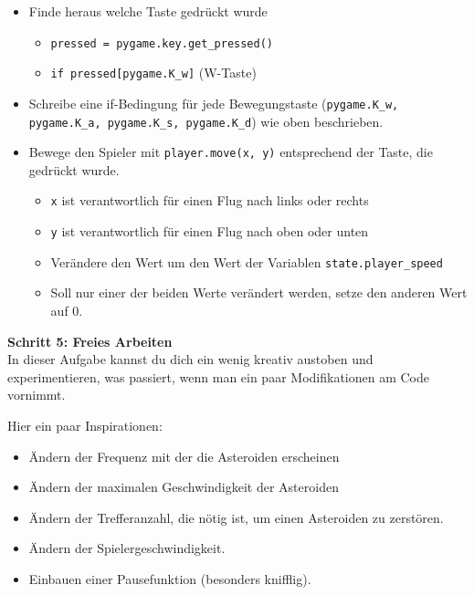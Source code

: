 \begin{itemize}
	\item Finde heraus welche Taste gedrückt wurde
	\begin{itemize}
		\item \texttt{pressed = pygame.key.get\_pressed()}
		\item \texttt{if pressed[pygame.K\_w]} (W-Taste)
	\end{itemize}
	\item Schreibe eine if-Bedingung für jede Bewegungstaste (\texttt{pygame.K\_w, pygame.K\_a, pygame.K\_s, pygame.K\_d}) wie oben beschrieben.
	\item Bewege den Spieler mit \texttt{player.move(x, y)} entsprechend der Taste, die gedrückt wurde.
	\begin{itemize}
		\item \texttt{x} ist verantwortlich für einen Flug nach links oder rechts
		\item \texttt{y} ist verantwortlich für einen Flug nach oben oder unten
		\item Verändere den Wert um den Wert der Variablen \texttt{state.player\_speed}
		\item Soll nur einer der beiden Werte verändert werden, setze den anderen Wert auf 0.
	\end{itemize}	 
\end{itemize}
\textbf{Schritt 5: Freies Arbeiten}\\
In dieser Aufgabe kannst du dich ein wenig kreativ austoben und experimentieren, was passiert, wenn man ein paar Modifikationen am Code vornimmt.

Hier ein paar Inspirationen:
\begin{itemize}
	\item Ändern der Frequenz mit der die Asteroiden erscheinen
	\item Ändern der maximalen Geschwindigkeit der Asteroiden
	\item Ändern der Trefferanzahl, die nötig ist, um einen Asteroiden zu zerstören.
	\item Ändern der Spielergeschwindigkeit.
	\item Einbauen einer Pausefunktion (besonders knifflig).
\end{itemize}